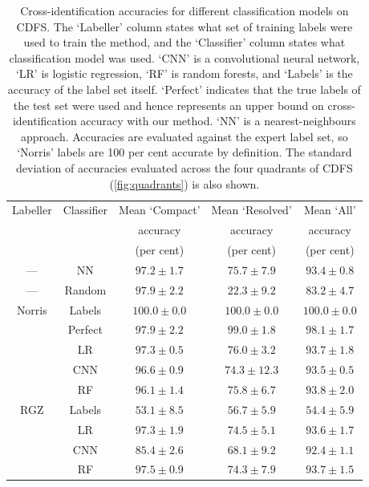   \begin{table}
    \caption[Cross-identification accuracies for different classification
    models on CDFS.]{Cross-identification accuracies for different classification
    models on CDFS. The `Labeller' column states what set of training labels
    were used to train the method, and the `Classifier' column states what
    classification model was used. `CNN' is a convolutional neural network,
    `LR' is logistic regression, `RF' is random forests, and `Labels' is the
    accuracy of the label set itself. `Perfect' indicates that the true labels
    of the test set were used and hence represents an upper bound on
    cross-identification accuracy with our method. `NN' is a
    nearest-neighbours approach. Accuracies are evaluated against the expert
    label set, so `Norris' labels are 100 per cent accurate by definition. The
    standard deviation of accuracies evaluated across the four quadrants of
    CDFS (\autoref{fig:quadrants}) is also shown.}
    \label{tab:cdfs-acc}
    \small\centering
    \begingroup
    \setlength{\tabcolsep}{8pt} %
    \begin{tabular}{ccccc}
      \hline\hline
      Labeller & Classifier & Mean `Compact' & Mean `Resolved' & Mean `All'\\
       &  & accuracy & accuracy & accuracy\\
       &  & (per cent) & (per cent) & (per cent)\\
      \hline
     ---& NN & $97.2 \pm 1.7$ & $75.7 \pm 7.9$ & $93.4 \pm 0.8$\\
     ---& Random & $97.9 \pm 2.2$ & $22.3 \pm 9.2$ & $83.2 \pm 4.7$\\
      Norris & Labels & $100.0 \pm 0.0$ & $100.0 \pm 0.0$ & $100.0 \pm 0.0$\\
             & Perfect & $97.9 \pm 2.2$ & $99.0 \pm 1.8$ & $98.1 \pm 1.7$\\
             & LR & $97.3 \pm 0.5$ & $76.0 \pm 3.2$ & $93.7 \pm 1.8$\\
             & CNN & $96.6 \pm 0.9$ & $74.3 \pm 12.3$ & $93.5 \pm 0.5$\\
             & RF & $96.1 \pm 1.4$ & $75.8 \pm 6.7$ & $93.8 \pm 2.0$\\
      RGZ & Labels & $53.1 \pm 8.5$ & $56.7 \pm 5.9$ & $54.4 \pm 5.9$\\
          & LR & $97.3 \pm 1.9$ & $74.5 \pm 5.1$ & $93.6 \pm 1.7$\\
          & CNN & $85.4 \pm 2.6$ & $68.1 \pm 9.2$ & $92.4 \pm 1.1$\\
          & RF & $97.5 \pm 0.9$ & $74.3 \pm 7.9$ & $93.7 \pm 1.5$\\
      \hline\hline
    \end{tabular}
    \endgroup
  \end{table}

